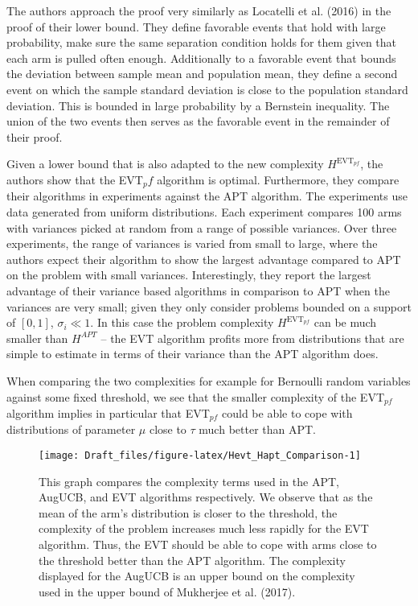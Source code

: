 \documentclass[12pt,]{article}
\begin{document}
The authors approach the proof very similarly as Locatelli et al. (2016)
in the proof of their lower bound. They define favorable events that
hold with large probability, make sure the same separation condition
holds for them given that each arm is pulled often enough. Additionally
to a favorable event that bounds the deviation between sample mean and
population mean, they define a second event on which the sample standard
deviation is close to the population standard deviation. This is bounded
in large probability by a Bernstein inequality. The union of the two
events then serves as the favorable event in the remainder of their
proof.

Given a lower bound that is also adapted to the new complexity
\(H^{\text{EVT}_{pf}}\), the authors show that the EVT\(_pf\) algorithm
is optimal. Furthermore, they compare their algorithms in experiments
against the APT algorithm. The experiments use data generated from
uniform distributions. Each experiment compares 100 arms with variances
picked at random from a range of possible variances. Over three
experiments, the range of variances is varied from small to large, where
the authors expect their algorithm to show the largest advantage
compared to APT on the problem with small variances. Interestingly, they
report the largest advantage of their variance based algorithms in
comparison to APT when the variances are very small; given they only
consider problems bounded on a support of \([0,1]\), \(\sigma_i \ll 1\).
In this case the problem complexity \(H^{\text{EVT}_{pf}}\) can be much
smaller than \(H^{APT}\) -- the EVT algorithm profits more from
distributions that are simple to estimate in terms of their variance
than the APT algorithm does.

When comparing the two complexities for example for Bernoulli random
variables against some fixed threshold, we see that the smaller
complexity of the EVT\(_{pf}\) algorithm implies in particular that
EVT\(_{pf}\) could be able to cope with distributions of parameter
\(\mu\) close to \(\tau\) much better than APT.

\begin{figure}

{\centering \texttt{[image: Draft\_files/figure-latex/Hevt\_Hapt\_Comparison-1]} 

}

\caption{This graph compares the complexity terms used in the APT, AugUCB, and EVT algorithms respectively. We observe that as the mean of the arm's distribution is closer to the threshold, the complexity of the problem increases much less rapidly for the EVT algorithm. Thus, the EVT should be able to cope with arms close to the threshold better than the APT algorithm. The complexity displayed for the AugUCB is an upper bound on the complexity used in the upper bound of Mukherjee et al. (2017).}\label{fig:Hevt_Hapt_Comparison}
\end{figure}
\end{document}

